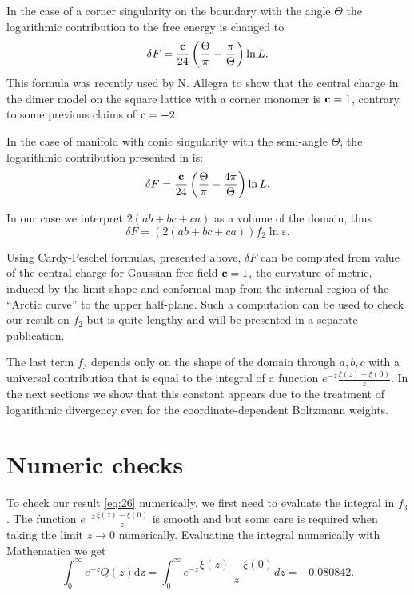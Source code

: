 \documentclass{article}
\newcommand{\dz}{\mathrm{dz}}
\begin{document}
In the case of a corner singularity on the boundary with the angle
$\Theta$ the logarithmic contribution to the free energy is changed to
\begin{equation}
  \label{eq:86}
  \delta F = \frac{{\bf c}}{24}\left(\frac{\Theta}{\pi}-\frac{\pi}{\Theta}\right) \ln L.
\end{equation}
This formula was recently used by N. Allegra \cite{allegra2015exact} to show that the central charge
in the dimer model on the square lattice with a corner monomer is ${\bf c}=1$, contrary to some
previous claims of ${\bf c}=-2$.

In the case of manifold with conic singularity with the semi-angle
$\Theta$, the logarithmic contribution presented in \cite{cardy1988finite} is:
\begin{equation}
  \label{eq:91}
  \delta F = \frac{{\bf c}}{24}\left(\frac{\Theta}{\pi}-\frac{4\pi}{\Theta}\right) \ln L.
\end{equation}


In our case we interpret $2(ab+bc+ca)$ as a volume of the domain, thus
\begin{equation}
  \label{eq:33}
  \delta F = \left(2(ab+bc+ca)\right) f_{2}\ln\varepsilon.
\end{equation}

Using Cardy-Peschel formulas, presented above, $\delta F$ can be
computed from value of the central charge for Gaussian free field
${\bf c}=1$, the curvature of metric, induced by the limit shape and
conformal map from the internal region of the ``Arctic curve'' to the
upper half-plane. Such a computation can be used to check our result
on $f_2$ but is quite lengthy and will be presented in a separate
publication.

The last term $f_{3}$ depends only on the shape of the domain through
$a,b,c$ with a universal contribution that is equal to the integral of
a function $e^{-z}\frac{\xi(z)-\xi(0)}{z}$. In the next sections we
show that this constant appears due to the treatment of logarithmic
divergency even for the coordinate-dependent Boltzmann weights. 

\section{Numeric checks}
\label{sec:numeric-checks}
To check our result \eqref{eq:26} numerically, we first need to evaluate the integral in $f_{3}$.
The function $e^{-z}\frac{\xi(z)-\xi(0)}{z}$ is smooth and but some care is required when taking the
limit $z\to 0$ numerically. Evaluating the integral numerically with Mathematica we get
\begin{equation}
  \label{eq:2}
  \int_{0}^{\infty}e^{-z}Q(z)\dz=\int_{0}^{\infty}e^{-z}\frac{\xi(z)-\xi(0)}{z} dz = -0.080842.%
\end{equation}
\end{document}

